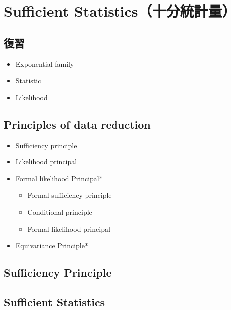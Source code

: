 \documentclass[
]{book}
\providecommand{\tightlist}{%
  \setlength{\itemsep}{0pt}\setlength{\parskip}{0pt}}
\begin{document}
\chapter{Sufficient Statistics（十分統計量）}\label{sufficient-statisticsux5341ux5206ux7d71ux8a08ux91cf}

\section*{復習}\label{ux5fa9ux7fd2-4}

\begin{itemize}
\tightlist
\item
  Exponential family
\item
  Statistic
\item
  Likelihood
\end{itemize}

\section*{Principles of data reduction}\label{principles-of-data-reduction}

\begin{itemize}
\tightlist
\item
  Sufficiency principle
\item
  Likelihood principal
\item
  Formal likelihood Principal*

  \begin{itemize}
  \tightlist
  \item
    Formal sufficiency principle
  \item
    Conditional principle
  \item
    Formal likelihood principal
  \end{itemize}
\item
  Equivariance Principle*
\end{itemize}

\section{Sufficiency Principle}\label{sufficiency-principle}

\section{Sufficient Statistics}\label{sufficient-statistics}
\end{document}
